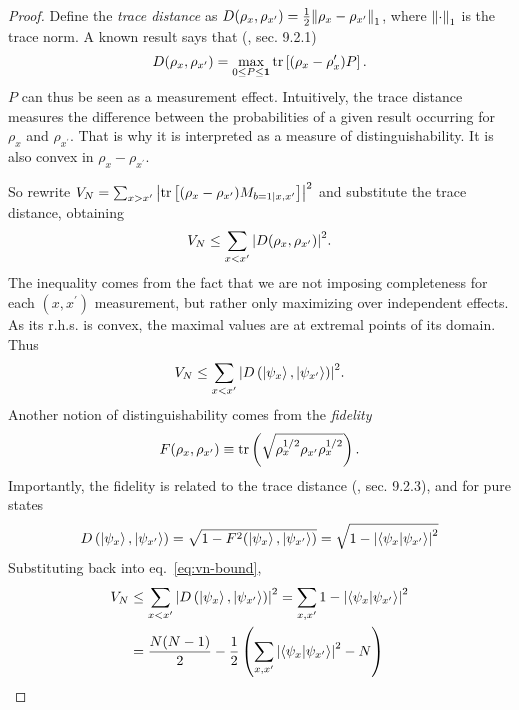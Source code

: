     \moremeasurements*
    \begin{proof}
        Define the \emph{trace distance} as $D(\rho_x, \rho_{x^\prime}) = \frac{1}{2} \norm{\rho_x - \rho_{x^\prime}}_1$, where $\norm{\cdot}_1$ is the trace norm. A known result says that (\cite{nielsen_chuang_book}, sec. 9.2.1)
        $$
            D(\rho_x, \rho_{x^\prime}) = \max_{0 \leq P \leq \mathbf{1}} \text{tr}\left[ (\rho_x - \rho_x^{\prime}) P \right] .
        $$
        $P$ can thus be seen as a measurement effect. Intuitively, the trace distance measures the difference between the probabilities of a given result occurring for $\rho_x$ and $\rho_{x^\prime}$. That is why it is interpreted as a measure of distinguishability. It is also convex in $\rho_x - \rho_{x^\prime}$.

        So rewrite $V_N = \sum_{x > x^\prime} \abs{ \text{tr}\left[ (\rho_x - \rho_{x^\prime}) M_{b=1 \mid x,x^\prime} \right]}^2$ and substitute the trace distance, obtaining
        $$
            V_N \leq \sum_{x < x^\prime} \abs{ D(\rho_x, \rho_{x^\prime}) }^2 .
        $$
        The inequality comes from the fact that we are not imposing completeness for each $(x,x^\prime)$ measurement, but rather only maximizing over independent effects. As its r.h.s. is convex, the maximal values are at extremal points of its domain. Thus
        \begin{equation}
            V_N \leq \sum_{x < x^\prime} \abs{ D\left( \ket{\psi_x}, \ket{\psi_{x^\prime}} \right) }^2 .
            \label{eq:vn-bound}
        \end{equation}
        Another notion of distinguishability comes from the \emph{fidelity}
        $$
            F(\rho_x, \rho_{x^\prime}) \equiv \text{tr}\left( \sqrt{\rho_x^{1/2} \rho_{x^\prime} \rho_x^{1/2}} \right).
        $$
        Importantly, the fidelity is related to the trace distance (\cite{nielsen_chuang_book}, sec. 9.2.3), and for pure states   
        $$
            D\left( \ket{\psi_x}, \ket{\psi_{x^\prime}} \right) = \sqrt{1 - F^2(\ket{\psi_x}, \ket{\psi_{x^\prime}})} = \sqrt{1 - \abs{\braket{\psi_x}{\psi_{x^\prime}}}^2}
        $$
        Substituting back into eq.~\eqref{eq:vn-bound},
        \begin{align*}
            V_N & \leq \sum_{x < x^\prime} \abs{ D\left( \ket{\psi_x}, \ket{\psi_{x^\prime}} \right) }^2
            = \sum_{x, x^\prime} 1 - \abs{\braket{\psi_x}{\psi_{x^\prime}}}^2 \\
            &= \frac{N(N-1)}{2} - \frac{1}{2} \left( \sum_{x, x^\prime} \abs{\braket{\psi_x}{\psi_{x^\prime}}}^2 - N \right) \\

\end{align*}
\end{proof}
